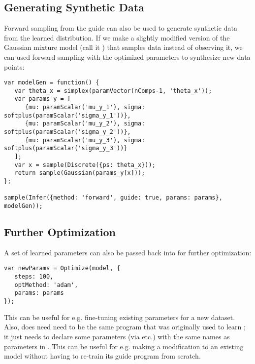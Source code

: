\subsection{Generating Synthetic Data}

Forward sampling from the guide can also be used to generate synthetic data from the learned distribution. If we make a slightly modified version of the Gaussian mixture model (call it ) that samples data instead of observing it, we can used forward sampling with the optimized parameters  to synthesize new data points:
\begin{lstlisting}
var modelGen = function() {
   var theta_x = simplex(paramVector(nComps-1, 'theta_x'));
   var params_y = [
      {mu: paramScalar('mu_y_1'), sigma: softplus(paramScalar('sigma_y_1'))},
      {mu: paramScalar('mu_y_2'), sigma: softplus(paramScalar('sigma_y_2'))},
      {mu: paramScalar('mu_y_3'), sigma: softplus(paramScalar('sigma_y_3'))}
   ];
   var x = sample(Discrete({ps: theta_x}));
   return sample(Gaussian(params_y[x]));
};

sample(Infer({method: 'forward', guide: true, params: params}, modelGen));
\end{lstlisting}

\subsection{Further Optimization}
\label{sec:furtherOptim}

A set of learned parameters  can also be passed back into  for further optimization:
\begin{lstlisting}
var newParams = Optimize(model, {
   steps: 100,
   optMethod: 'adam',
   params: params
});
\end{lstlisting}
This can be useful for e.g. fine-tuning existing parameters for a new dataset. Also,  does need need to be the same program that was originally used to learn ; it just needs to declare some parameters (via  etc.) with the same names as parameters in . This can be useful for e.g. making a modification to an existing model without having to re-train its guide program from scratch.
